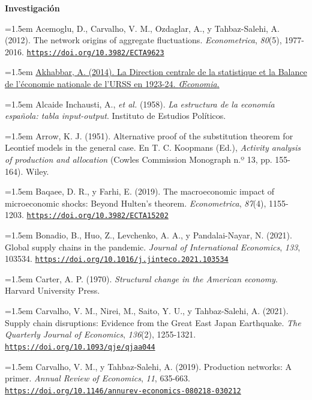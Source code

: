 \documentclass[10pt,a4paper]{article}
\begin{document}
\textbf{Investigación}

\noindent\hangindent=1.5em Acemoglu, D., Carvalho, V. M., Ozdaglar, A., y Tahbaz-Salehi, A. (2012). The network origins of aggregate fluctuations. \textit{Econometrica}, \textit{80}(5), 1977-2016. \href{https://doi.org/10.3982/ECTA9623}{\nolinkurl{https://doi.org/10.3982/ECTA9623}}

\noindent\hangindent=1.5em \href{https://mpra.ub.uni-muenchen.de/61762/}{Akhabbar, A. (2014). La Direction centrale de la statistique et la Balance de l'économie nationale de l'URSS en 1923-24. \textit{\OE{}conomia}.}

\noindent\hangindent=1.5em Alcaide Inchausti, A., \textit{et al.} (1958). \textit{La estructura de la economía española: tabla input-output}. Instituto de Estudios Políticos.

\noindent\hangindent=1.5em Arrow, K. J. (1951). Alternative proof of the substitution theorem for Leontief models in the general case. En T. C. Koopmans (Ed.), \textit{Activity analysis of production and allocation} (Cowles Commission Monograph n.º 13, pp. 155-164). Wiley.

\noindent\hangindent=1.5em Baqaee, D. R., y Farhi, E. (2019). The macroeconomic impact of microeconomic shocks: Beyond Hulten's theorem. \textit{Econometrica}, \textit{87}(4), 1155-1203. \href{https://doi.org/10.3982/ECTA15202}{\nolinkurl{https://doi.org/10.3982/ECTA15202}}

\noindent\hangindent=1.5em Bonadio, B., Huo, Z., Levchenko, A. A., y Pandalai-Nayar, N. (2021). Global supply chains in the pandemic. \textit{Journal of International Economics}, \textit{133}, 103534. \href{https://doi.org/10.1016/j.jinteco.2021.103534}{\nolinkurl{https://doi.org/10.1016/j.jinteco.2021.103534}}

\noindent\hangindent=1.5em Carter, A. P. (1970). \textit{Structural change in the American economy}. Harvard University Press.

\noindent\hangindent=1.5em Carvalho, V. M., Nirei, M., Saito, Y. U., y Tahbaz-Salehi, A. (2021). Supply chain disruptions: Evidence from the Great East Japan Earthquake. \textit{The Quarterly Journal of Economics}, \textit{136}(2), 1255-1321. \href{https://doi.org/10.1093/qje/qjaa044}{\nolinkurl{https://doi.org/10.1093/qje/qjaa044}}

\noindent\hangindent=1.5em Carvalho, V. M., y Tahbaz-Salehi, A. (2019). Production networks: A primer. \textit{Annual Review of Economics}, \textit{11}, 635-663. \href{https://doi.org/10.1146/annurev-economics-080218-030212}{\nolinkurl{https://doi.org/10.1146/annurev-economics-080218-030212}}
\end{document}

